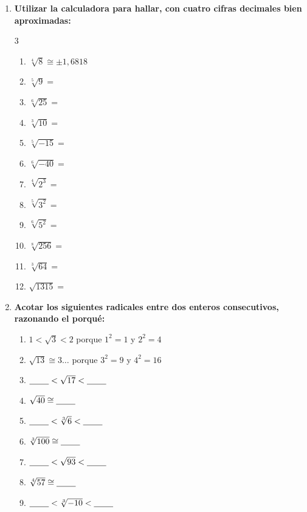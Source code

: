 \documentclass[a4paper,12pt]{article}
\begin{document}
\begin{enumerate}[start=4]
    \item \textbf{Utilizar la calculadora para hallar, con cuatro cifras decimales bien aproximadas:}
    \begin{multicols}{3}
    \begin{enumerate}[label=\alph*)]
        \item $\sqrt[4]{8} \cong \pm 1{,}6818$
        \item $\sqrt[5]{9} =$
        \item $\sqrt[6]{25} =$
        \item $\sqrt[3]{10} =$
        \item $\sqrt[5]{-15} =$
        \item $\sqrt[6]{-40} =$
        \item $\sqrt[4]{2^3} =$
        \item $\sqrt[5]{3^2} =$
        \item $\sqrt[6]{5^2} =$
        \item $\sqrt[8]{256} =$
        \item $\sqrt[3]{64} =$
        \item $\sqrt{1315} =$
    \end{enumerate}
    \end{multicols}

    \item \textbf{Acotar los siguientes radicales entre dos enteros consecutivos, razonando el porqué:}
    \begin{enumerate}[label=\alph*)]
        \item $1 < \sqrt{3} < 2$ porque $1^2 = 1$ y $2^2 = 4$
        \item $\sqrt{13} \cong 3\dots$ porque $3^2 = 9$ y $4^2 = 16$
        \item $\underline{\hspace{0.8cm}} < \sqrt{17} < \underline{\hspace{0.8cm}}$
        \item $\sqrt{40} \cong \underline{\hspace{0.8cm}}$
        \item $\underline{\hspace{0.8cm}} < \sqrt[3]{6} < \underline{\hspace{0.8cm}}$
        \item $\sqrt[3]{100} \cong \underline{\hspace{0.8cm}}$
        \item $\underline{\hspace{0.8cm}} < \sqrt{93} < \underline{\hspace{0.8cm}}$
        \item $\sqrt[4]{57} \cong \underline{\hspace{0.8cm}}$
        \item $\underline{\hspace{0.8cm}} < \sqrt[3]{-10} < \underline{\hspace{0.8cm}}$
    \end{enumerate}


\end{enumerate}
\end{document}
